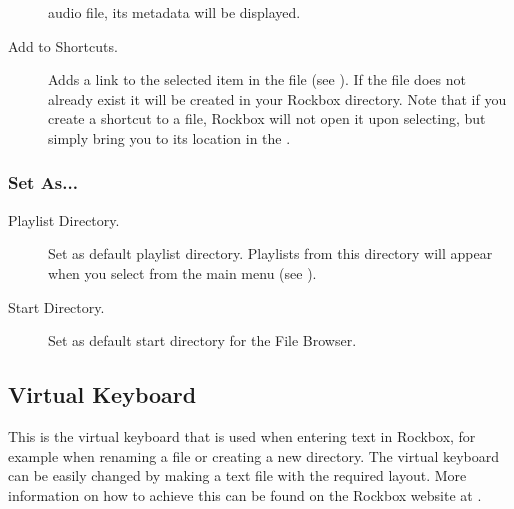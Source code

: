 \begin{description}
  audio file, its metadata will be displayed.
\item [Add to Shortcuts.]
  Adds a link to the selected item in the  file
  (see ).
  If the file does not already exist it will be created in your Rockbox directory.
  Note that if you create a shortcut to a file, Rockbox will not open it upon
  selecting, but simply bring you to its location in the .
\end{description}

\subsubsection{Set As...}
\begin{description}
  \item [Playlist Directory.]
     Set as default playlist directory. Playlists from this directory will appear
     when you select  from the main menu
     (see ).
  \item [\label{ref:StartDirectory}Start Directory.]
   Set as default start directory for the File Browser.
\end{description}

\subsection{\label{sec:virtual_keyboard}Virtual Keyboard}
This is the virtual keyboard that is used when entering text in Rockbox, for
example when renaming a file or creating a new directory.
The virtual keyboard can be easily changed by making a text file
with the required layout. More information on how to achieve this can be found
on the Rockbox website at .

